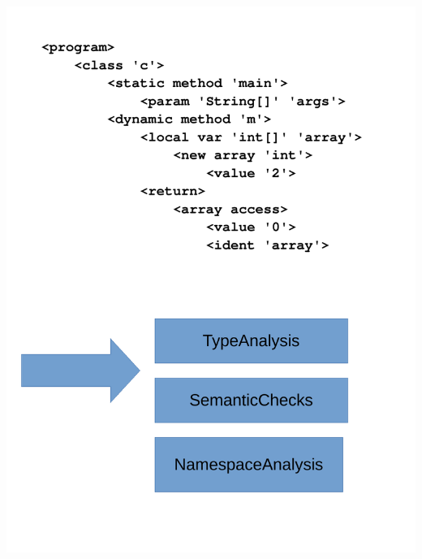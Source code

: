 \documentclass[navbaroff,en]{sdqbeamer}
\begin{document}
\begin{frame}
\begin{columns}
\begin{column}{0.5\textwidth}
		\centering \includegraphics[scale=0.24]{images/semantic_tests.pdf}
\end{column}
\end{columns}

\end{frame}
\end{document}
